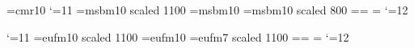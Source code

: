 

\def\bye{}
 \font\tenrm=cmr10
\SetTexturesEPSFSpecial %
\HideDisplacementBoxes
\def\figin#1#2{
$$
 {\BoxedEPSF{#1.eps scaled
#2}%
}%
$$
\noindent}
\catcode`\@=11
\font\twelvemsb=msbm10 scaled 1100
\font\tenmsb=msbm10
\font\ninemsb=msbm10 scaled 800
\newfam\msbfam
\textfont\msbfam=\twelvemsb  \scriptfont\msbfam=\ninemsb
  \scriptscriptfont\msbfam=\ninemsb
\def\msb@{\hexnumber@\msbfam}
\def\Bbb{\relax\ifmmode\let\next\Bbb@\else
 \def\next{\errmessage{Use \string\Bbb\space only in math
mode}}\fi\next}
\def\Bbb@#1{{\Bbb@@{#1}}}
\def\Bbb@@#1{\fam\msbfam#1}
\catcode`\@=12


 \catcode`\@=11
\font\twelveeuf=eufm10 scaled 1100
\font\teneuf=eufm10
\font\nineeuf=eufm7 scaled 1100%
\newfam\euffam
\textfont\euffam=\twelveeuf  \scriptfont\euffam=\teneuf
  \scriptscriptfont\euffam=\nineeuf
\def\euf@{\hexnumber@\euffam}
\def\frak{\relax\ifmmode\let\next\frak@\else
 \def\next{\errmessage{Use \string\frak\space only in math
mode}}\fi\next}
\def\frak@#1{{\frak@@{#1}}}
\def\frak@@#1{\fam\euffam#1}
\catcode`\@=12

\title{} %
\shorttitle{} %



